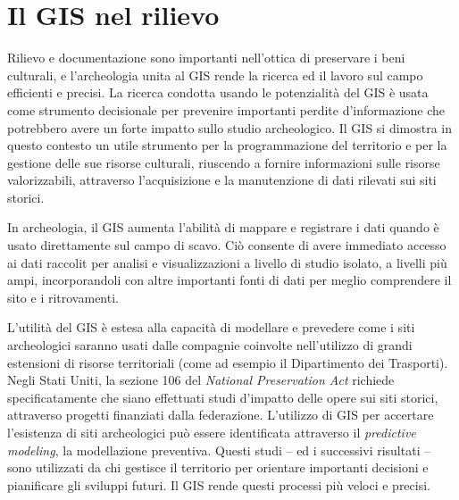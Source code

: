 \section{Il GIS nel rilievo}
	Rilievo e documentazione sono importanti nell'ottica di preservare i beni culturali, e l'archeologia unita al GIS rende la ricerca ed il lavoro sul campo efficienti e precisi. La ricerca condotta usando le potenzialità del GIS è usata come strumento decisionale per prevenire importanti perdite d'informazione che potrebbero avere un forte impatto sullo studio archeologico. Il GIS si dimostra in questo contesto un utile strumento per la programmazione del territorio e per la gestione delle sue risorse culturali, riuscendo a fornire informazioni sulle risorse valorizzabili, attraverso l'acquisizione e la manutenzione di dati rilevati sui siti storici.

	In archeologia, il GIS aumenta l'abilità di mappare e registrare i dati quando è usato direttamente sul campo di scavo. Ciò consente di avere immediato accesso ai dati raccolit per analisi e visualizzazioni a livello di studio isolato, a livelli più ampi, incorporandoli con altre importanti fonti di dati per meglio comprendere il sito e i ritrovamenti.

	L'utilità del GIS è estesa alla capacità di modellare e prevedere come i siti archeologici saranno usati dalle compagnie coinvolte nell'utilizzo di grandi estensioni di risorse territoriali (come ad esempio il Dipartimento dei Trasporti). Negli Stati Uniti, la sezione 106 del \emph{National Preservation Act} richiede specificatamente che siano effettuati studi d'impatto delle opere sui siti storici, attraverso progetti finanziati dalla federazione. L'utilizzo di GIS per accertare l'esistenza di siti archeologici può essere identificata attraverso il \emph{predictive modeling}, la modellazione preventiva. Questi studi -- ed i successivi risultati -- sono utilizzati da chi gestisce il territorio per orientare importanti decisioni e pianificare gli sviluppi futuri. Il GIS rende questi processi più veloci e precisi.

